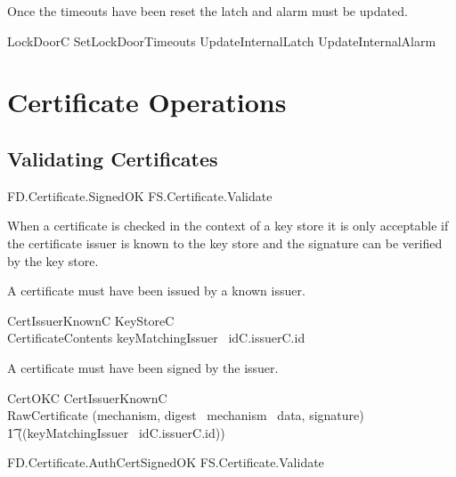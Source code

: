 Once the timeouts have been reset the latch and alarm must be updated.

\begin{zed}
        LockDoorC  SetLockDoorTimeouts \semi UpdateInternalLatch
        \semi UpdateInternalAlarm
\end{zed}


\section{Certificate Operations}

\subsection{Validating Certificates}

\begin{traceunit}{FD.Certificate.SignedOK}
{FS.Certificate.Validate}
\end{traceunit}

When a certificate is checked in the context of a key store it is
only acceptable if the certificate issuer is known to the key store
and the signature can be verified by the key store.

A certificate must have been issued by a known issuer.

\begin{schema}{CertIssuerKnownC}
        KeyStoreC
\\      CertificateContents
\where
        keyMatchingIssuer~ idC.issuerC.id \neq \Nil
\end{schema}

A certificate must have been signed by the issuer. 

\begin{schema}{CertOKC}
        CertIssuerKnownC
\\      
        RawCertificate
\where
        (mechanism, digest~ mechanism~ data, 
        signature) 
\\ \t1   \isVerifiedBy (\The (keyMatchingIssuer~ idC.issuerC.id))
\end{schema}

\begin{traceunit}{FD.Certificate.AuthCertSignedOK}
{FS.Certificate.Validate}
\end{traceunit}



